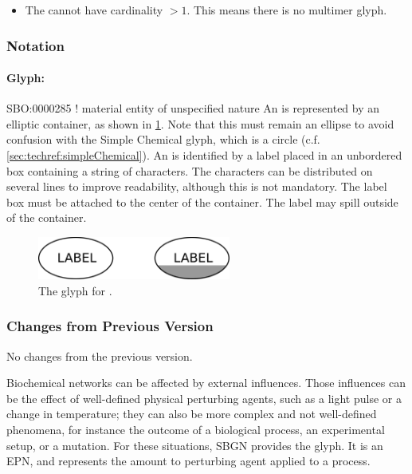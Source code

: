 \begin{itemize}
\item The  cannot have cardinality $>
  1$. This means there is no multimer glyph.
\end{itemize}

\subsubsection{Notation}

\paragraph{Glyph: }

\begin{glyphDescription}
\glyphSboTerm SBO:0000285 ! material entity of unspecified nature
\glyphContainer An  is represented by an
elliptic container, as shown in \ref{fig:techref:unspecified}.  Note that this
must remain an ellipse to avoid confusion with the Simple Chemical
glyph, which is a circle (c.f.\, \ref{sec:techref:simpleChemical}).
\glyphLabel An  is identified by a label
placed in an unbordered box containing a string of characters.  The
characters can be distributed on several lines to improve readability,
although this is not mandatory.  The label box must be attached to the
center of the container.  The label may spill outside of the
container.
\end{glyphDescription}

\begin{figure}[htb]
  \centering
  \includegraphics[width=2.5in]{images/unspecified}
  \caption{The \PD glyph for .}
  \label{fig:techref:unspecified}
\end{figure}

\subsubsection{Changes from Previous Version}

No changes from the previous version.

\label{sec:techref:perturbing agent}

Biochemical networks can be affected by external influences.  Those
influences can be the effect of well-defined physical perturbing
agents, such as a light pulse or a change in temperature; they can
also be more complex and not well-defined phenomena, for instance the
outcome of a biological process, an experimental setup, or a mutation.
For these situations, SBGN provides the 
glyph. It is an EPN, and represents the amount to perturbing agent
applied to a process.

